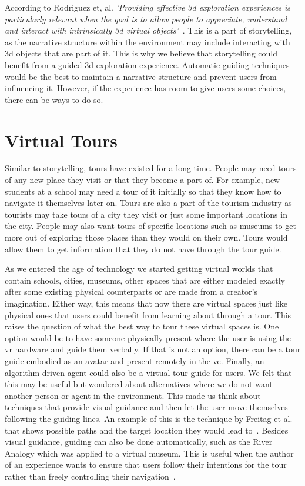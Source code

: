 According to Rodriguez et, al. \textit{'Providing effective \acrshort{3d} exploration experiences is particularly relevant when the goal is to allow people to appreciate, understand and interact with intrinsically \acrshort{3d} virtual objects'}~\cite{Rodriguez2015}. This is a part of storytelling, as the narrative structure within the environment may include interacting with \acrshort{3d} objects that are part of it. This is why we believe that storytelling could benefit from a guided \acrshort{3d} exploration experience. Automatic guiding techniques would be the best to maintain a narrative structure and prevent users from influencing it. However, if the experience has room to give users some choices, there can be ways to do so. 

\section{Virtual Tours}
\label{section GJM: Virtual Tours}
Similar to storytelling, tours have existed for a long time. People may need tours of any new place they visit or that they become a part of. For example, new students at a school may need a tour of it initially so that they know how to navigate it themselves later on. Tours are also a part of the tourism industry as tourists may take tours of a city they visit or just some important locations in the city. People may also want tours of specific locations such as museums to get more out of exploring those places than they would on their own. Tours would allow them to get information that they do not have through the tour guide.

As we entered the age of technology we started getting virtual worlds that contain schools, cities, museums, other spaces that are either modeled exactly after some existing physical counterparts or are made from a creator's imagination. Either way, this means that now there are virtual spaces just like physical ones that users could benefit from learning about through a tour. This raises the question of what the best way to tour these virtual spaces is. One option would be to have someone physically present where the user is using the \acrshort{vr} hardware and guide them verbally. If that is not an option, there can be a tour guide embodied as an avatar and present remotely in the \acrshort{ve}. Finally, an algorithm-driven agent could also be a virtual tour guide for users. We felt that this may be useful but wondered about alternatives where we do not want another person or agent in the environment. This made us think about techniques that provide visual guidance and then let the user move themselves following the guiding lines. An example of this is the technique by Freitag et al. that shows possible paths and the target location they would lead to~\cite{Freitag2018}. Besides visual guidance, guiding can also be done automatically, such as the River Analogy which was applied to a virtual museum. This is useful when the author of an experience wants to ensure that users follow their intentions for the tour rather than freely controlling their navigation~\cite{Galyean1995}.

